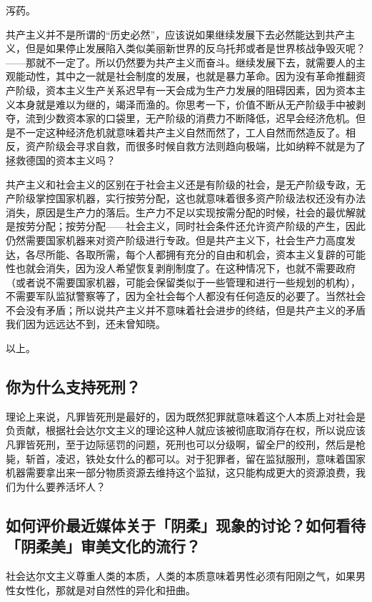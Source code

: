 \documentclass{ctexart}
\begin{document}
	泻药。
	
	共产主义并不是所谓的“历史必然”，应该说如果继续发展下去必然能达到共产主义，但是如果停止发展陷入类似美丽新世界的反乌托邦或者是世界核战争毁灭呢？——那就不一定了。所以仍然要为共产主义而奋斗。继续发展下去，就需要人的主观能动性，其中之一就是社会制度的发展，也就是暴力革命。因为没有革命推翻资产阶级，资本主义生产关系迟早有一天会成为生产力发展的阻碍因素，因为资本主义本身就是难以为继的，竭泽而渔的。你思考一下，价值不断从无产阶级手中被剥夺，流到少数资本家的口袋里，无产阶级的消费力不断降低，迟早会经济危机。但是不一定这种经济危机就意味着共产主义自然而然了，工人自然而然造反了。相反，资产阶级会寻求自救，而很多时候自救方法则趋向极端，比如纳粹不就是为了拯救德国的资本主义吗？
	
	共产主义和社会主义的区别在于社会主义还是有阶级的社会，是无产阶级专政，无产阶级掌控国家机器，实行按劳分配，这也就意味着很多资产阶级法权还没有办法消失，原因是生产力的落后。生产力不足以实现按需分配的时候，社会的最优解就是按劳分配；按劳分配——社会主义，同时社会条件还允许资产阶级的产生，因此仍然需要国家机器来对资产阶级进行专政。但是共产主义下，社会生产力高度发达，各尽所能、各取所需，每个人都拥有充分的自由和机会，资本主义复辟的可能性也就会消失，因为没人希望恢复剥削制度了。在这种情况下，也就不需要政府（或者说不需要国家机器，可能会保留类似于一些管理和进行一些规划的机构），不需要军队监狱警察等了，因为全社会每个人都没有任何造反的必要了。当然社会不会没有矛盾；所以说共产主义并不意味着社会进步的终结，但是共产主义的矛盾我们因为远远达不到，还未曾知晓。
	
	以上。
	
	\subsection{你为什么支持死刑？}
	
	理论上来说，凡罪皆死刑是最好的，因为既然犯罪就意味着这个人本质上对社会是负贡献，根据社会达尔文主义的理论这种人就应该被彻底取消存在权，所以说应该凡罪皆死刑，至于边际惩罚的问题，死刑也可以分级啊，留全尸的绞刑，然后是枪毙，斩首，凌迟，铁处女什么的都可以。对于犯罪者，留在监狱服刑，意味着国家机器需要拿出来一部分物质资源去维持这个监狱，这只能构成更大的资源浪费，我们为什么要养活坏人？
	
	\subsection{如何评价最近媒体关于「阴柔」现象的讨论？如何看待「阴柔美」审美文化的流行？}
	
	社会达尔文主义尊重人类的本质，人类的本质意味着男性必须有阳刚之气，如果男性女性化，那就是对自然性的异化和扭曲。
	
\end{document}
